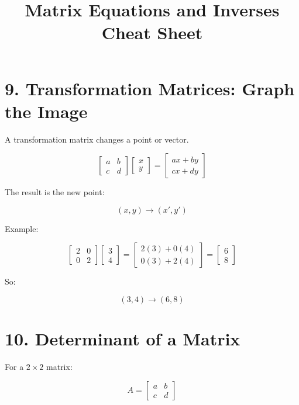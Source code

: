 \documentclass[11pt]{article}
\title{Matrix Equations and Inverses Cheat Sheet}
\author{}
\date{}
\begin{document}
\maketitle

\section*{9. Transformation Matrices: Graph the Image}

A transformation matrix changes a point or vector.

\[
\begin{bmatrix}
a & b\\
c & d
\end{bmatrix}
\begin{bmatrix}
x\\
y
\end{bmatrix}
=
\begin{bmatrix}
ax+by\\
cx+dy
\end{bmatrix}
\]

The result is the new point:

\[
(x,y)\rightarrow (x',y')
\]

Example:

\[
\begin{bmatrix}
2 & 0\\
0 & 2
\end{bmatrix}
\begin{bmatrix}
3\\
4
\end{bmatrix}
=
\begin{bmatrix}
2(3)+0(4)\\
0(3)+2(4)
\end{bmatrix}
=
\begin{bmatrix}
6\\
8
\end{bmatrix}
\]

So:

\[
(3,4)\rightarrow(6,8)
\]

\section*{10. Determinant of a Matrix}

For a \(2\times2\) matrix:

\[
A=
\begin{bmatrix}
a & b\\
c & d
\end{bmatrix}
\]
\end{document}
